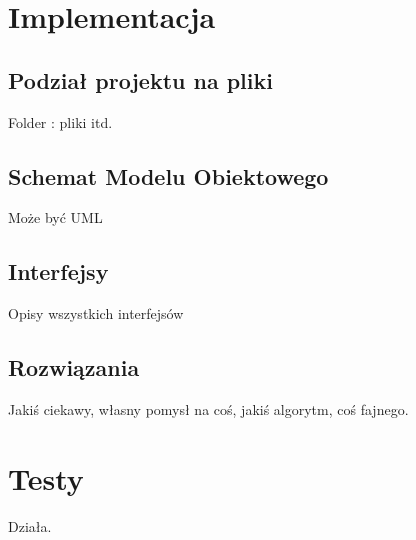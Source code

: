 \documentclass[12pt,a4paper]{article}
\begin{document}
	\section{Implementacja}
		\subsection{Podział projektu na pliki}
			Folder : pliki itd.
		\subsection{Schemat Modelu Obiektowego}
			Może być UML		
		\subsection{Interfejsy}
			Opisy wszystkich interfejsów
		\subsection{Rozwiązania}
			Jakiś ciekawy, własny pomysł na coś, jakiś algorytm, coś fajnego.
	\section{Testy}
		Działa. 
\end{document}
